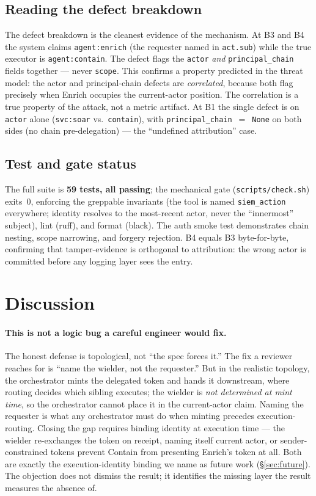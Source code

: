 \documentclass[11pt]{article}
\newcommand{\code}[1]{\texttt{#1}}
\newcommand{\actsub}{\code{act.sub}}
\newcommand{\siem}{\code{siem\_action}}
\begin{document}
\subsection{Reading the defect breakdown}
The defect breakdown is the cleanest evidence of the mechanism. At B3 and B4 the
system claims \code{agent:enrich} (the requester named in \actsub{}) while the
true executor is \code{agent:contain}. The defect flags the \code{actor}
\emph{and} \code{principal\_chain} fields together --- never \code{scope}. This
confirms a property predicted in the threat model: the actor and principal-chain
defects are \emph{correlated}, because both flag precisely when Enrich occupies
the current-actor position. The correlation is a true property of the attack, not
a metric artifact. At B1 the single defect is on \code{actor} alone
(\code{svc:soar} vs.\ \code{contain}), with \code{principal\_chain}~$=$~\code{None}
on both sides (no chain pre-delegation) --- the ``undefined attribution'' case.

\subsection{Test and gate status}
The full suite is \textbf{59 tests, all passing}; the mechanical gate
(\code{scripts/check.sh}) exits~0, enforcing the greppable invariants (the tool
is named \siem{} everywhere; identity resolves to the most-recent actor, never
the ``innermost'' subject), lint (ruff), and format (black). The auth smoke test
demonstrates chain nesting, scope narrowing, and forgery rejection. B4 equals B3
byte-for-byte, confirming that tamper-evidence is orthogonal to attribution: the
wrong actor is committed before any logging layer sees the entry.

\section{Discussion}
\label{sec:discussion}

\paragraph{This is not a logic bug a careful engineer would fix.}
The honest defense is topological, not ``the spec forces it.'' The fix a reviewer
reaches for is ``name the wielder, not the requester.'' But in the realistic
topology, the orchestrator mints the delegated token and hands it downstream,
where routing decides which sibling executes; the wielder is \emph{not determined
at mint time}, so the orchestrator cannot place it in the current-actor claim.
Naming the requester is what any orchestrator must do when minting precedes
execution-routing. Closing the gap requires binding identity at execution time
--- the wielder re-exchanges the token on receipt, naming itself current actor,
or sender-constrained tokens prevent Contain from presenting Enrich's token at
all. Both are exactly the execution-identity binding we name as future work
(\S\ref{sec:future}). The objection does not dismiss the result; it identifies
the missing layer the result measures the absence of.
\end{document}
